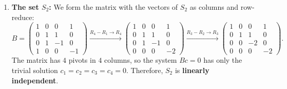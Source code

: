 \begin{exercisesolution*}
\begin{enumerate}[label=\textbf{(\alph*)}]
\[    -\begin{pmatrix} 1 \\ 0 \\ 0 \\ 1 \end{pmatrix} - \begin{pmatrix} 2 \\ 3 \\ -3 \\ 9 \end{pmatrix} + \begin{pmatrix} 1 \\ 3 \\ -4 \\ 7 \end{pmatrix} + \begin{pmatrix} 2 \\ 0 \\ 1 \\ 3 \end{pmatrix} = \begin{pmatrix} 0 \\ 0 \\ 0 \\ 0 \end{pmatrix}.
    \]
    Therefore, $S_1$ is \textbf{linearly dependent}.

    \item \textbf{The set $S_2$:}
    We form the matrix with the vectors of $S_2$ as columns and row-reduce:
    \[
    B = \begin{pmatrix}
    1 & 0 & 0 & 1 \\
    0 & 1 & 1 & 0 \\
    0 & 1 & -1 & 0 \\
    1 & 0 & 0 & -1
    \end{pmatrix}
    \xrightarrow{R_4 - R_1 \to R_4}
    \begin{pmatrix}
    1 & 0 & 0 & 1 \\
    0 & 1 & 1 & 0 \\
    0 & 1 & -1 & 0 \\
    0 & 0 & 0 & -2
    \end{pmatrix}
    \xrightarrow{R_3 - R_2 \to R_3}
    \begin{pmatrix}
    1 & 0 & 0 & 1 \\
    0 & 1 & 1 & 0 \\
    0 & 0 & -2 & 0 \\
    0 & 0 & 0 & -2
    \end{pmatrix}.
    \]
    The matrix has $4$ pivots in $4$ columns, so the system $B c = 0$ has only the trivial solution $c_1 = c_2 = c_3 = c_4 = 0$.
    Therefore, $S_2$ is \textbf{linearly independent}.
\end{enumerate}
\end{exercisesolution*}

